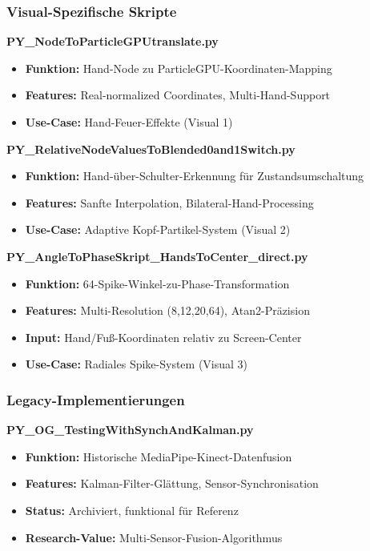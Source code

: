 \subsubsection{Visual-Spezifische Skripte}

\textbf{PY\_NodeToParticleGPUtranslate.py}
\begin{itemize}
    \item \textbf{Funktion:} Hand-Node zu ParticleGPU-Koordinaten-Mapping
    \item \textbf{Features:} Real-normalized Coordinates, Multi-Hand-Support
    \item \textbf{Use-Case:} Hand-Feuer-Effekte (Visual 1)
\end{itemize}

\textbf{PY\_RelativeNodeValuesToBlended0and1Switch.py}
\begin{itemize}
    \item \textbf{Funktion:} Hand-über-Schulter-Erkennung für Zustandsumschaltung
    \item \textbf{Features:} Sanfte Interpolation, Bilateral-Hand-Processing
    \item \textbf{Use-Case:} Adaptive Kopf-Partikel-System (Visual 2)
\end{itemize}

\textbf{PY\_AngleToPhaseSkript\_HandsToCenter\_direct.py}
\begin{itemize}
    \item \textbf{Funktion:} 64-Spike-Winkel-zu-Phase-Transformation
    \item \textbf{Features:} Multi-Resolution (8,12,20,64), Atan2-Präzision
    \item \textbf{Input:} Hand/Fuß-Koordinaten relativ zu Screen-Center
    \item \textbf{Use-Case:} Radiales Spike-System (Visual 3)
\end{itemize}

\subsubsection{Legacy-Implementierungen}

\textbf{PY\_OG\_TestingWithSynchAndKalman.py}
\begin{itemize}
    \item \textbf{Funktion:} Historische MediaPipe-Kinect-Datenfusion
    \item \textbf{Features:} Kalman-Filter-Glättung, Sensor-Synchronisation
    \item \textbf{Status:} Archiviert, funktional für Referenz
    \item \textbf{Research-Value:} Multi-Sensor-Fusion-Algorithmus
\end{itemize}

